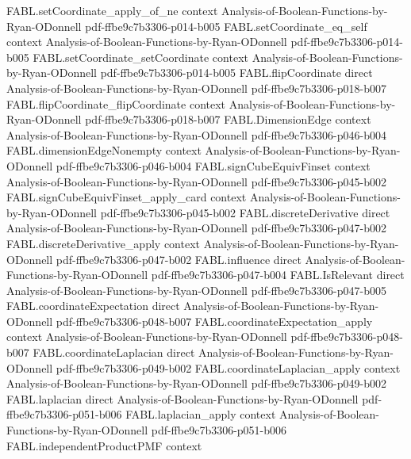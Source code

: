 \begin{theorem}
\proofstep
  {FABL.setCoordinate_apply_of_ne}
  {context}
  {Analysis-of-Boolean-Functions-by-Ryan-ODonnell}
  {pdf-ffbe9c7b3306-p014-b005}
\proofstep
  {FABL.setCoordinate_eq_self}
  {context}
  {Analysis-of-Boolean-Functions-by-Ryan-ODonnell}
  {pdf-ffbe9c7b3306-p014-b005}
\proofstep
  {FABL.setCoordinate_setCoordinate}
  {context}
  {Analysis-of-Boolean-Functions-by-Ryan-ODonnell}
  {pdf-ffbe9c7b3306-p014-b005}
\proofstep
  {FABL.flipCoordinate}
  {direct}
  {Analysis-of-Boolean-Functions-by-Ryan-ODonnell}
  {pdf-ffbe9c7b3306-p018-b007}
\proofstep
  {FABL.flipCoordinate_flipCoordinate}
  {context}
  {Analysis-of-Boolean-Functions-by-Ryan-ODonnell}
  {pdf-ffbe9c7b3306-p018-b007}
\proofstep
  {FABL.DimensionEdge}
  {context}
  {Analysis-of-Boolean-Functions-by-Ryan-ODonnell}
  {pdf-ffbe9c7b3306-p046-b004}
\proofstep
  {FABL.dimensionEdgeNonempty}
  {context}
  {Analysis-of-Boolean-Functions-by-Ryan-ODonnell}
  {pdf-ffbe9c7b3306-p046-b004}
\proofstep
  {FABL.signCubeEquivFinset}
  {context}
  {Analysis-of-Boolean-Functions-by-Ryan-ODonnell}
  {pdf-ffbe9c7b3306-p045-b002}
\proofstep
  {FABL.signCubeEquivFinset_apply_card}
  {context}
  {Analysis-of-Boolean-Functions-by-Ryan-ODonnell}
  {pdf-ffbe9c7b3306-p045-b002}
\proofstep
  {FABL.discreteDerivative}
  {direct}
  {Analysis-of-Boolean-Functions-by-Ryan-ODonnell}
  {pdf-ffbe9c7b3306-p047-b002}
\proofstep
  {FABL.discreteDerivative_apply}
  {context}
  {Analysis-of-Boolean-Functions-by-Ryan-ODonnell}
  {pdf-ffbe9c7b3306-p047-b002}
\proofstep
  {FABL.influence}
  {direct}
  {Analysis-of-Boolean-Functions-by-Ryan-ODonnell}
  {pdf-ffbe9c7b3306-p047-b004}
\proofstep
  {FABL.IsRelevant}
  {direct}
  {Analysis-of-Boolean-Functions-by-Ryan-ODonnell}
  {pdf-ffbe9c7b3306-p047-b005}
\proofstep
  {FABL.coordinateExpectation}
  {direct}
  {Analysis-of-Boolean-Functions-by-Ryan-ODonnell}
  {pdf-ffbe9c7b3306-p048-b007}
\proofstep
  {FABL.coordinateExpectation_apply}
  {context}
  {Analysis-of-Boolean-Functions-by-Ryan-ODonnell}
  {pdf-ffbe9c7b3306-p048-b007}
\proofstep
  {FABL.coordinateLaplacian}
  {direct}
  {Analysis-of-Boolean-Functions-by-Ryan-ODonnell}
  {pdf-ffbe9c7b3306-p049-b002}
\proofstep
  {FABL.coordinateLaplacian_apply}
  {context}
  {Analysis-of-Boolean-Functions-by-Ryan-ODonnell}
  {pdf-ffbe9c7b3306-p049-b002}
\proofstep
  {FABL.laplacian}
  {direct}
  {Analysis-of-Boolean-Functions-by-Ryan-ODonnell}
  {pdf-ffbe9c7b3306-p051-b006}
\proofstep
  {FABL.laplacian_apply}
  {context}
  {Analysis-of-Boolean-Functions-by-Ryan-ODonnell}
  {pdf-ffbe9c7b3306-p051-b006}
\proofstep
  {FABL.independentProductPMF}
  {context}

\end{theorem}
